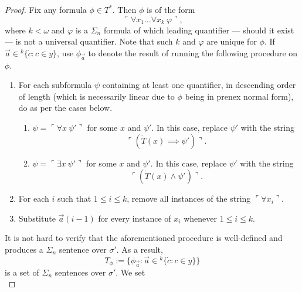 \documentclass[12pt, twoside]{memoir}
\numberwithin{equation}{section}
\theoremstyle{definition}
\theoremstyle{remark}
\theoremstyle{definition}
\theoremstyle{definition}
\theoremstyle{definition}
\theoremstyle{remark}
\begin{document}
\begin{proof}
Fix any formula $\phi \in T^*$. Then $\phi$ is of the form 
\begin{equation*}
    \ulcorner \forall x_1 \dots \forall x_k \ \varphi \urcorner \text{,}
\end{equation*}
where $k < \omega$ and $\varphi$ is a $\Sigma_n$ formula of which leading quantifier --- should it exist --- is not a universal quantifier. Note that such $k$ and $\varphi$ are unique for $\phi$. If $\Vec{a} \in {^{k}{\{\dot{c} : c \in y\}}}$, use $\phi_{\Vec{a}}$ to denote the result of running the following procedure on $\phi$.
\begin{enumerate}[label=(\arabic*)]
    \item For each subformula $\psi$ containing at least one quantifier, in descending order of length (which is necessarily linear due to $\phi$ being in prenex normal form), do as per the cases below.
    \begin{enumerate}[label=Case (\arabic*)$_{\psi}$:, leftmargin=70pt]
        \item $\psi = \ulcorner \forall x \ \psi' \urcorner$ for some $x$ and $\psi'$. In this case, replace $\psi'$ with the string
        \begin{equation*}
            \ulcorner (\dot{T}(x) \implies \psi') \urcorner \text{.}
        \end{equation*}
        \item $\psi = \ulcorner \exists x \ \psi' \urcorner$ for some $x$ and $\psi'$. In this case, replace $\psi'$ with the string
        \begin{equation*}
            \ulcorner (\dot{T}(x) \wedge \psi') \urcorner \text{.}
        \end{equation*}
    \end{enumerate}
    \item For each $i$ such that $1 \leq i \leq k$, remove all instances of the string $\ulcorner \forall x_i \urcorner$.
    \item Substitute $\Vec{a}(i - 1)$ for every instance of $x_i$ whenever $1 \leq i \leq k$.
\end{enumerate}
It is not hard to verify that the aforementioned procedure is well-defined and produces a $\Sigma_n$ sentence over $\sigma'$. As a result, 
\begin{equation*}
    T_{\phi} := \{\phi_{\Vec{a}} : \Vec{a} \in {^{k}{\{\dot{c} : c \in y\}}}\}
\end{equation*}
is a set of $\Sigma_n$ sentences over $\sigma'$. We set 
\begin{equation*}

\end{equation*}
\end{proof}
\end{document}

